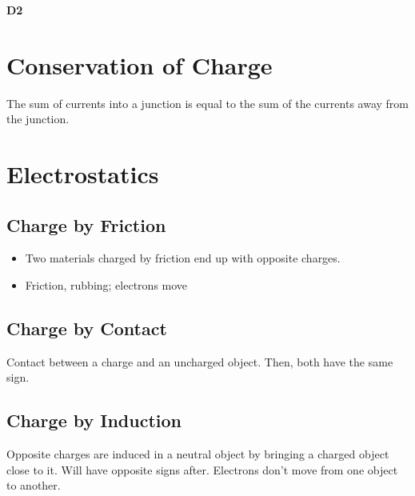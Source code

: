 \documentclass[a4paper,12pt]{article}
\begin{document}
\pagestyle{fancy}


\begin{titlepage}
  \begin{center}
    \vspace*{3cm}

    \textbf{\Large  {D2}}

    \vspace{1cm}


    \vfill

    \vspace{1.5cm}

  \end{center}
\end{titlepage}
\pagebreak
\tableofcontents
\pagebreak

\clearpage
\setcounter{page}{1}

\pagebreak

\section{Conservation of Charge}

The sum of currents into a junction is equal to the sum of the currents away from the junction.

\section{Electrostatics}

\subsection{Charge by Friction}
\begin{itemize}
  \item Two materials charged by friction end up with opposite charges.
  \item Friction, rubbing; electrons move
\end{itemize}
\subsection{Charge by Contact}
Contact between a charge and an uncharged object. Then, both have the same sign.
\subsection{Charge by Induction}

Opposite charges are induced in a neutral object by bringing a charged object close to it. Will have opposite signs after. Electrons don't move from one object to another.
\end{document}
